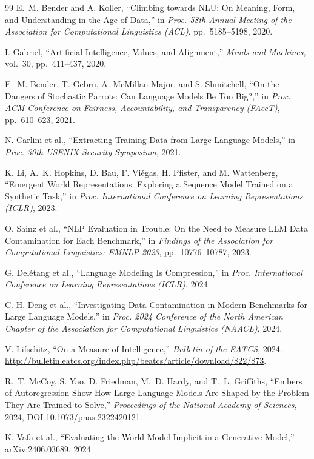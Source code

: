 \documentclass[11pt]{article}
\begin{document}
\begin{thebibliography}{99}
E.~M. Bender and A. Koller,
\newblock ``Climbing towards NLU: On Meaning, Form, and Understanding in the Age of Data,''
\newblock in \emph{Proc. 58th Annual Meeting of the Association for Computational Linguistics (ACL)}, pp.~5185--5198, 2020.

I. Gabriel,
\newblock ``Artificial Intelligence, Values, and Alignment,''
\newblock \emph{Minds and Machines}, vol.~30, pp.~411--437, 2020.

E.~M. Bender, T. Gebru, A. McMillan-Major, and S. Shmitchell,
\newblock ``On the Dangers of Stochastic Parrots: Can Language Models Be Too Big?,''
\newblock in \emph{Proc. ACM Conference on Fairness, Accountability, and Transparency (FAccT)}, pp.~610--623, 2021.

N. Carlini et al.,
\newblock ``Extracting Training Data from Large Language Models,''
\newblock in \emph{Proc. 30th USENIX Security Symposium}, 2021.

K. Li, A.~K. Hopkins, D. Bau, F. Vi{\'e}gas, H. Pfister, and M. Wattenberg,
\newblock ``Emergent World Representations: Exploring a Sequence Model Trained on a Synthetic Task,''
\newblock in \emph{Proc. International Conference on Learning Representations (ICLR)}, 2023.

O. Sainz et al.,
\newblock ``NLP Evaluation in Trouble: On the Need to Measure LLM Data Contamination for Each Benchmark,''
\newblock in \emph{Findings of the Association for Computational Linguistics: EMNLP 2023}, pp.~10776--10787, 2023.

G. Del{\'e}tang et al.,
\newblock ``Language Modeling Is Compression,''
\newblock in \emph{Proc. International Conference on Learning Representations (ICLR)}, 2024.

C.-H. Deng et al.,
\newblock ``Investigating Data Contamination in Modern Benchmarks for Large Language Models,''
\newblock in \emph{Proc. 2024 Conference of the North American Chapter of the Association for Computational Linguistics (NAACL)}, 2024.

V. Lifschitz,
\newblock ``On a Measure of Intelligence,''
\newblock \emph{Bulletin of the EATCS}, 2024.
\newblock \url{http://bulletin.eatcs.org/index.php/beatcs/article/download/822/873}.

R.~T. McCoy, S. Yao, D. Friedman, M.~D. Hardy, and T.~L. Griffiths,
\newblock ``Embers of Autoregression Show How Large Language Models Are Shaped by the Problem They Are Trained to Solve,''
\newblock \emph{Proceedings of the National Academy of Sciences}, 2024, DOI 10.1073/pnas.2322420121.

K. Vafa et al.,
\newblock ``Evaluating the World Model Implicit in a Generative Model,''
\newblock arXiv:2406.03689, 2024.

\end{thebibliography}
\end{document}
